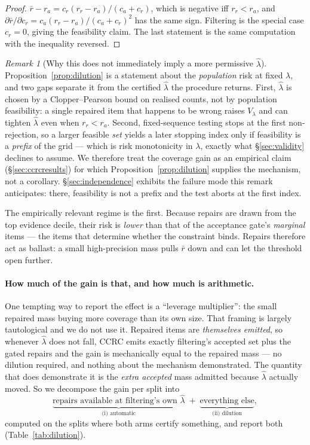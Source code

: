 \documentclass{article}
\theoremstyle{plain}
\theoremstyle{definition}
\theoremstyle{remark}
\newtheorem{remark}{Remark}
\begin{document}
\begin{proof}
$\bar r-r_a=c_r(r_r-r_a)/(c_a+c_r)$, which is negative iff $r_r<r_a$, and
$\partial\bar r/\partial c_r=c_a(r_r-r_a)/(c_a+c_r)^2$ has the same sign. Filtering is the
special case $c_r=0$, giving the feasibility claim. The last statement is the same
computation with the inequality reversed.
\end{proof}

\begin{remark}[Why this does not immediately imply a more permissive $\hat\lambda$]
\label{rem:prefix}
Proposition~\ref{prop:dilution} is a statement about the \emph{population} risk at fixed
$\lambda$, and two gaps separate it from the certified $\hat\lambda$ the procedure returns.
First, $\hat\lambda$ is chosen by a Clopper--Pearson bound on realised counts, not by
population feasibility: a single repaired item that happens to be wrong raises $V_\lambda$
and can tighten $\hat\lambda$ even when $r_r<r_a$. Second, fixed-sequence testing stops at
the first non-rejection, so a larger feasible \emph{set} yields a later stopping index only
if feasibility is a \emph{prefix} of the grid --- which is risk monotonicity in $\lambda$,
exactly what \S\ref{sec:validity} declines to assume. We therefore treat the coverage gain
as an empirical claim (\S\ref{sec:ccrcresults}) for which Proposition~\ref{prop:dilution}
supplies the mechanism, not a corollary. \S\ref{sec:independence} exhibits the failure mode
this remark anticipates: there, feasibility is not a prefix and the test aborts at the first
index.
\end{remark}

The empirically relevant regime is the first. Because repairs are drawn from the top
evidence decile, their risk is \emph{lower} than that of the acceptance gate's
\emph{marginal} items --- the items that determine whether the constraint binds. Repairs
therefore act as ballast: a small high-precision mass pulls $\bar r$ down and can let the
threshold open further.

\paragraph{How much of the gain is that, and how much is arithmetic.}
One tempting way to report the effect is a ``leverage multiplier'': the small repaired mass
buying more coverage than its own size. That framing is largely tautological and we do
not use it. Repaired items are \emph{themselves emitted}, so whenever
$\hat\lambda$ does not fall, CCRC emits exactly filtering's accepted set plus the gated repairs
and the gain is mechanically equal to the repaired mass --- no dilution required, and nothing
about the mechanism demonstrated. The quantity that does demonstrate it is the \emph{extra
accepted} mass admitted because $\hat\lambda$ actually moved. So we decompose the gain per
split into
\[
\underbrace{\text{repairs available at filtering's own }\hat\lambda}_{\text{(i) automatic}}
\;+\;\underbrace{\text{everything else}}_{\text{(ii) dilution}},
\]
computed on the splits where both arms certify something, and report both
(Table~\ref{tab:dilution}).
\end{document}
